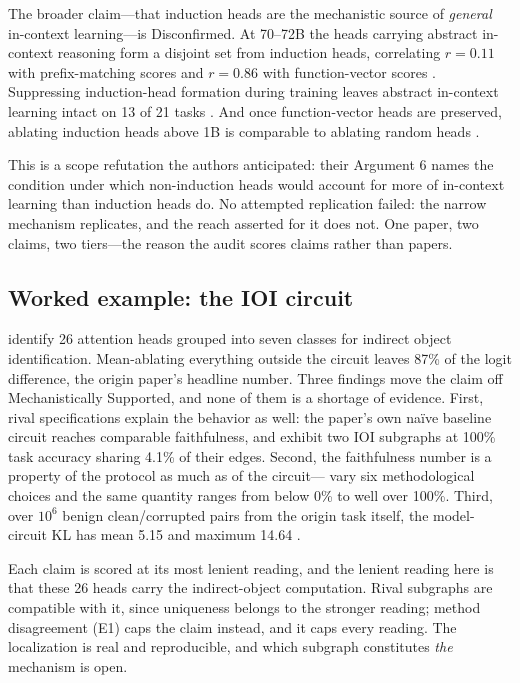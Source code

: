 \documentclass{article}
\begin{document}
The broader claim---that induction heads are the mechanistic source of \emph{general} in-context learning---is Disconfirmed. At 70--72B the heads carrying abstract in-context reasoning form a disjoint set from induction heads, correlating $r=0.11$ with prefix-matching scores and $r=0.86$ with function-vector scores \citep{webb2025emergent}. Suppressing induction-head formation during training leaves abstract in-context learning intact on 13 of 21 tasks \citep{sahin2025incontext}. And once function-vector heads are preserved, ablating induction heads above 1B is comparable to ablating random heads \citep{yin2025which}.

This is a scope refutation the authors anticipated: their Argument 6 names the condition under which non-induction heads would account for more of in-context learning than induction heads do. No attempted replication failed: the narrow mechanism replicates, and the reach asserted for it does not. One paper, two claims, two tiers---the reason the audit scores claims rather than papers.

\subsection{Worked example: the IOI circuit}
\label{sec:example-ioi}

\citet{wang2023interpretability} identify 26 attention heads grouped into seven classes for indirect object identification. Mean-ablating everything outside the circuit leaves 87\% of the logit difference, the origin paper's headline number. Three findings move the claim off Mechanistically Supported, and none of them is a shortage of evidence. First, rival specifications explain the behavior as well: the paper's own na\"ive baseline circuit reaches comparable faithfulness, and \citet{chen2026circuits} exhibit two IOI subgraphs at 100\% task accuracy sharing 4.1\% of their edges. Second, the faithfulness number is a property of the protocol as much as of the circuit---\citet{miller2024transformer} vary six methodological choices and the same quantity ranges from below 0\% to well over 100\%. Third, over $10^6$ benign clean/corrupted pairs from the origin task itself, the model-circuit KL has mean 5.15 and maximum 14.64 \citep{uitdebos2024adversarial}.

Each claim is scored at its most lenient reading, and the lenient reading here is that these 26 heads carry the indirect-object computation. Rival subgraphs are compatible with it, since uniqueness belongs to the stronger reading; method disagreement (E1) caps the claim instead, and it caps every reading. The localization is real and reproducible, and which subgraph constitutes \emph{the} mechanism is open.
\end{document}
